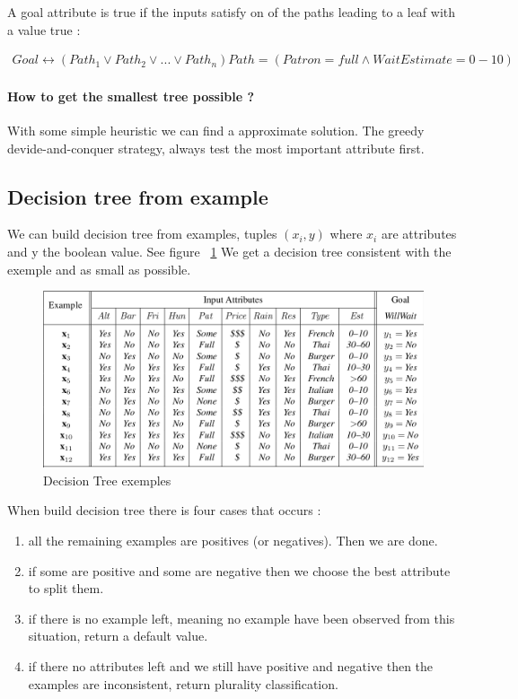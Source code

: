 A goal attribute is true if the inputs satisfy on of the paths leading  to a leaf with a value true :

\begin{align}
Goal \leftrightarrow (Path_1 \lor Path_2 \lor ... \lor Path_n)
Path = ( Patron = full \land WaitEstimate = 0-10 )
\end{align}

\paragraph{How to get the smallest tree possible ?}
With some simple heuristic we can find a approximate solution. The greedy devide-and-conquer strategy, always test the most important
attribute first.

\subsection{Decision tree from example}
We can build decision tree from examples, tuples $(x_i,y)$ where $x_i$ are attributes and y the boolean value. See figure ~\ref{decisionTreeFromEx}
We get a decision tree consistent with the exemple and as small as possible.

\begin{figure}[h]
    \centering
    \includegraphics[width=14cm]{decisionTreeEx.png}
    \caption{Decision Tree exemples}
    \label{decisionTreeFromEx} 
\end{figure}

When build decision tree there is four cases that occurs :
\begin{enumerate}
\item all the remaining examples are positives (or negatives). Then we are done.
\item if some are positive and some are negative then we choose the best attribute to split them.
\item if there is no example left, meaning no example have been observed from this situation, return a default value.
\item if there no attributes left and we still have positive and negative then the examples are inconsistent, return plurality classification.
\end{enumerate}

